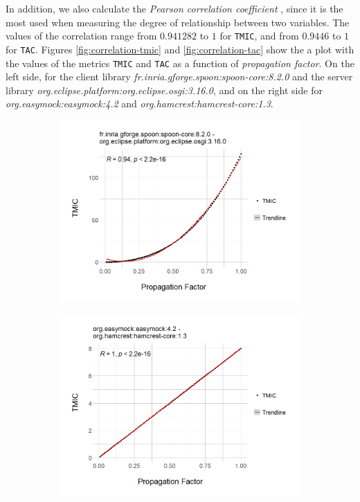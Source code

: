 In addition, we also calculate the \textit{Pearson correlation coefficient} \cite{everitt2002cambridge}, since it is the most used when measuring the degree of relationship between two variables. The values of the correlation range from $0.941282$ to $1$ for \texttt{TMIC}, and from $0.9446$ to $1$ for \texttt{TAC}. Figures \ref{fig:correlation-tmic} and \ref{fig:correlation-tac} show the a plot with the values of the metrics \texttt{TMIC} and \texttt{TAC} as a function of \textit{propagation factor}. On the left side, for the client library \textit{fr.inria.gforge.spoon:spoon-core:8.2.0} and the server library \textit{org.eclipse.platform:org.eclipse.osgi:3.16.0}, and on the right side for \textit{org.easymock:easymock:4.2} and \textit{org.hamcrest:hamcrest-core:1.3}.

\begin{figure}[ht!]
\begin{center}
  \begin{subfigure}[b]{0.48\textwidth}
    \includegraphics[width=\textwidth]{figures/results/Rplot_spoon-core_eclipse-osgi_TMIC.png}
  \end{subfigure}
  \begin{subfigure}[b]{0.48\textwidth}
    \includegraphics[width=\textwidth]{figures/results/Rplot_easymock_hamcrest_TMIC.png}

\end{subfigure}
\end{center}
\end{figure}
